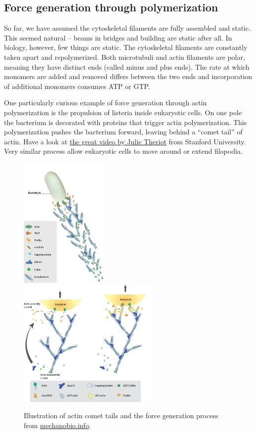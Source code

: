 \subsection*{Force generation through polymerization}
So far, we have assumed the cytoskeletal filaments are fully assembled and static.
This seemed natural -- beams in bridges and building are static after all.
In biology, however, few things are static.
The cytoskeletal filaments are constantly taken apart and repolymerized.
Both microtubuli and actin filaments are polar, meaning they have distinct ends (called minus and plus ends).
The rate at which monomers are added and removed differs between the two ends and incorporation of additional monomers consumes ATP or GTP.

One particularly curious example of force generation through actin polymerization is the propulsion of listeria inside eukaryotic cells.
On one pole the bacterium is decorated with proteins that trigger actin polymerization.
This polymerization pushes the bacterium forward, leaving behind a ``comet tail'' of actin.
Have a look at \href{https://www.youtube.com/watch?v=FIT0fdt6c3Y}{the great video by Julie Theriot} from Stanford University.
Very similar process allow eukaryotic cells to move around or extend filopodia.

\begin{figure}[tb]
	\centering
	\includegraphics[width=0.38\textwidth]{figures/actin-comet-tails.jpg}
	\includegraphics[width=0.61\textwidth]{figures/actin-polymerization-produces-force.jpg}
	\caption{Illustration of actin comet tails and the force generation process from \href{https://www.mechanobio.info/pathogenesis/what-are-actin-comet-tails/}{mechanobio.info}. }
	\label{fig:actin_comet_tail}
\end{figure}


